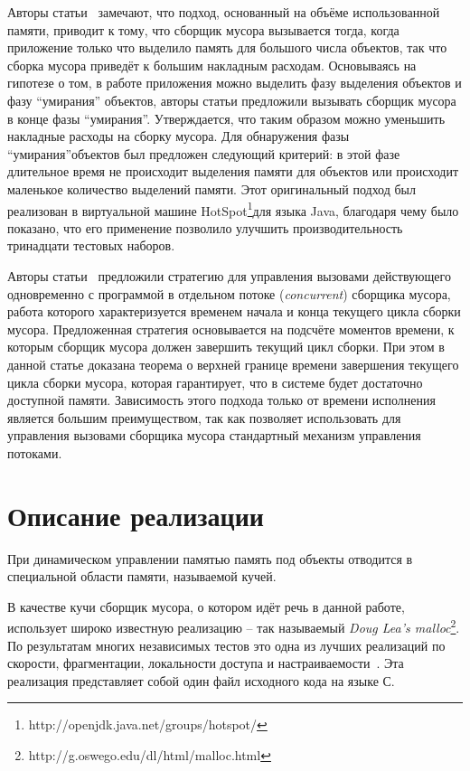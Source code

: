 \documentclass[14pt]{extarticle}
\begin{document}
Авторы статьи~\cite{microphase} замечают, что подход, основанный на объёме 
использованной памяти, приводит к тому, что сборщик мусора вызывается тогда, 
когда приложение только что выделило память для большого числа объектов, так что
сборка мусора приведёт к большим накладным расходам. Основываясь на гипотезе о том, 
в работе приложения можно выделить фазу выделения объектов и фазу ``умирания'' объектов,
авторы статьи предложили вызывать сборщик мусора в конце фазы ``умирания''. Утверждается,
что таким образом можно уменьшить накладные расходы на сборку мусора.
Для обнаружения фазы ``умирания''объектов был предложен следующий критерий: в этой
фазе длительное время не происходит выделения памяти для объектов или происходит маленькое 
количество выделений памяти. Этот оригинальный подход был реализован в виртуальной машине 
HotSpot\footnote{http://openjdk.java.net/groups/hotspot/}для 
языка Java, благодаря чему было показано,
что его применение позволило улучшить производительность тринадцати тестовых наборов. 


Авторы статьи~\cite{time-triggered} предложили стратегию для управления
вызовами действующего одновременно с программой в отдельном потоке
(\textit{concurrent}) сборщика мусора,
работа которого характеризуется временем начала и конца текущего цикла сборки мусора.
Предложенная стратегия основывается на подсчёте моментов времени, к которым
сборщик мусора должен завершить текущий цикл сборки. При этом в данной статье 
доказана теорема о верхней границе времени завершения текущего цикла сборки мусора,
которая гарантирует, что в системе будет достаточно доступной памяти. Зависимость этого
подхода только от времени исполнения является большим преимуществом, так как позволяет
использовать для управления вызовами сборщика мусора стандартный механизм управления
потоками. 
\pagebreak[4]
\section{Описание реализации}

При динамическом управлении памятью память под объекты отводится в специальной 
области памяти, называемой кучей. 

В качестве кучи сборщик мусора, о котором идёт речь в данной работе, использует
широко известную реализацию -- так называемый 
\textit{Doug Lea's malloc}\footnote{http://g.oswego.edu/dl/html/malloc.html}.
По результатам
многих независимых тестов это одна из лучших реализаций 
по скорости, фрагментации, локальности доступа и настраиваемости~\cite{Zorn}. 
Эта реализация представляет собой один файл исходного кода на языке С. 
\end{document}
